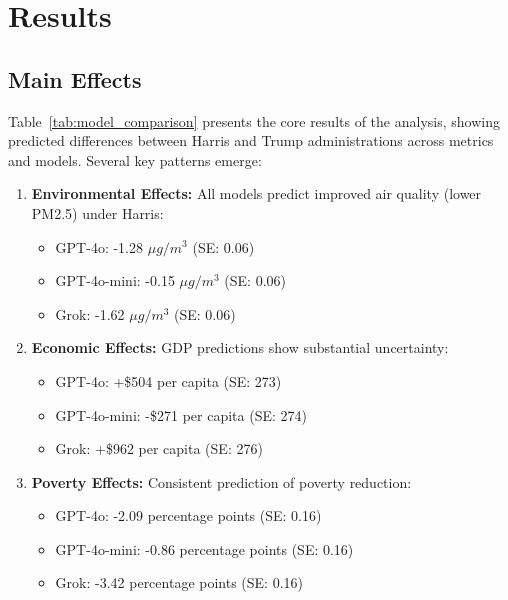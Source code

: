 \section{Results}\label{sec:results}

\subsection{Main Effects}

Table~\ref{tab:model_comparison} presents the core results of the analysis, showing predicted differences between Harris and Trump administrations across metrics and models. Several key patterns emerge:

\begin{enumerate}
    \item \textbf{Environmental Effects:} All models predict improved air quality (lower PM2.5) under Harris:
    \begin{itemize}
        \item GPT-4o: -1.28 $\mu g/m^3$ (SE: 0.06)
        \item GPT-4o-mini: -0.15 $\mu g/m^3$ (SE: 0.06)
        \item Grok: -1.62 $\mu g/m^3$ (SE: 0.06)
    \end{itemize}
    
    \item \textbf{Economic Effects:} GDP predictions show substantial uncertainty:
    \begin{itemize}
        \item GPT-4o: +\$504 per capita (SE: 273)
        \item GPT-4o-mini: -\$271 per capita (SE: 274)
        \item Grok: +\$962 per capita (SE: 276)
    \end{itemize}
    
    \item \textbf{Poverty Effects:} Consistent prediction of poverty reduction:
    \begin{itemize}
        \item GPT-4o: -2.09 percentage points (SE: 0.16)
        \item GPT-4o-mini: -0.86 percentage points (SE: 0.16)
        \item Grok: -3.42 percentage points (SE: 0.16)
    \end{itemize}
\end{enumerate}

